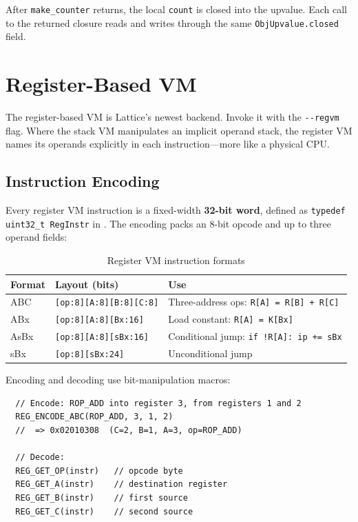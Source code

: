 After \lstinline|make_counter| returns, the local \lstinline|count| is closed
into the upvalue. Each call to the returned closure reads and writes through the
same \lstinline|ObjUpvalue.closed| field.

\section{Register-Based VM}\label{sec:reg-vm}

The register-based VM is Lattice's newest backend. Invoke it with the
\lstinline|--regvm| flag. Where the stack VM manipulates an implicit operand
stack, the register VM names its operands explicitly in each instruction---more
like a physical CPU.

\subsection{Instruction Encoding}\label{subsec:reg-encoding}

Every register VM instruction is a fixed-width \textbf{32-bit word}, defined as
\lstinline|typedef uint32_t RegInstr| in . The
encoding packs an 8-bit opcode and up to three operand fields:

\begin{table}[h]
\centering
\caption{Register VM instruction formats}\label{tab:reg-formats}
\begin{tabular}{@{} l l p{5.8cm} @{}}
\toprule
\textbf{Format} & \textbf{Layout (bits)} & \textbf{Use} \\
\midrule
ABC   & \texttt{[op:8][A:8][B:8][C:8]}   & Three-address ops:
  \lstinline|R[A] = R[B] + R[C]| \\
ABx   & \texttt{[op:8][A:8][Bx:16]}      & Load constant:
  \lstinline|R[A] = K[Bx]| \\
AsBx  & \texttt{[op:8][A:8][sBx:16]}     & Conditional jump:
  \lstinline|if !R[A]: ip += sBx| \\
sBx   & \texttt{[op:8][sBx:24]}          & Unconditional jump \\
\bottomrule
\end{tabular}
\end{table}

Encoding and decoding use bit-manipulation macros:

\begin{verbatim}
  // Encode: ROP_ADD into register 3, from registers 1 and 2
  REG_ENCODE_ABC(ROP_ADD, 3, 1, 2)
  //  => 0x02010308  (C=2, B=1, A=3, op=ROP_ADD)

  // Decode:
  REG_GET_OP(instr)   // opcode byte
  REG_GET_A(instr)    // destination register
  REG_GET_B(instr)    // first source
  REG_GET_C(instr)    // second source
\end{verbatim}

